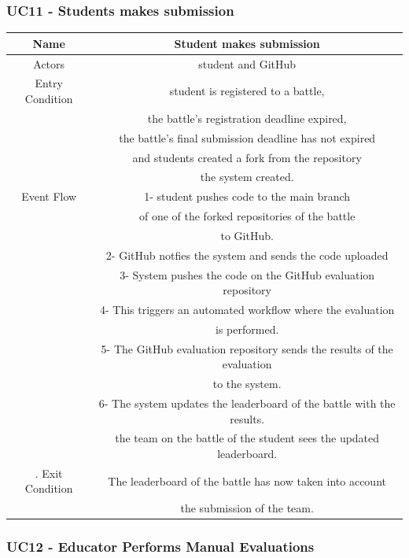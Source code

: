 \documentclass{article}
\begin{document}
\subsubsection*{UC11 - Students makes submission}

\begin{tabular*}{\linewidth}{@{\extracolsep{\fill}} cc }
    \hline
    Name & Student makes submission \\ 
    \hline
    Actors & student and GitHub\\ 
    \hline
    Entry Condition & student is registered to a battle,\\
                    & the battle's registration deadline expired,\\
                    & the battle's final submission deadline has not expired\\
                    & and students created a fork from the repository \\
                    & the system created.\\
    \hline
    Event Flow & 1- student pushes code to the main branch\\
               & of one of the forked repositories of the battle\\
               & to GitHub.\\
               & 2- GitHub notfies the system and sends the code uploaded\\
               & 3- System pushes the code on the GitHub evaluation repository\\
               & 4- This triggers an automated workflow where the evaluation\\
               & is performed.\\
               & 5- The GitHub evaluation repository sends the results of the evaluation\\
               & to the system.\\
               & 6- The system updates the leaderboard of the battle with the results.\\
               & the team on the battle of the student sees the updated leaderboard.\\
    \hline.
    Exit Condition & The leaderboard of the battle has now taken into account\\
                   & the submission of the team.\\
    \hline
\end{tabular*}

\subsubsection*{UC12 - Educator Performs Manual Evaluations}
\end{document}
